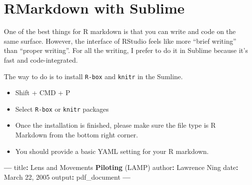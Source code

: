 \documentclass[]{book}
\newenvironment{Shaded}{\begin{snugshade}}{\end{snugshade}}
\newcommand{\DecValTok}[1]{\textcolor[rgb]{0.00,0.00,0.81}{#1}}
\newcommand{\KeywordTok}[1]{\textcolor[rgb]{0.13,0.29,0.53}{\textbf{#1}}}
\newcommand{\NormalTok}[1]{#1}
\newcommand{\OperatorTok}[1]{\textcolor[rgb]{0.81,0.36,0.00}{\textbf{#1}}}
\newcommand{\StringTok}[1]{\textcolor[rgb]{0.31,0.60,0.02}{#1}}
\providecommand{\tightlist}{%
  \setlength{\itemsep}{0pt}\setlength{\parskip}{0pt}}
\begin{document}
\hypertarget{rmarkdown-with-sublime}{%
\chapter{RMarkdown with Sublime}\label{rmarkdown-with-sublime}}

One of the best things for R markdown is that you can write and code on the same surface. However, the interface of RStudio feels like more ``brief writing'' than ``proper writing''. For all the writing, I prefer to do it in Sublime because it's fast and code-integrated.

The way to do is to install \texttt{R-box} and \texttt{knitr} in the Sumline.

\begin{itemize}
\tightlist
\item
  Shift + CMD + P
\item
  Select \texttt{R-box} or \texttt{knitr} packages
\item
  Once the installation is finished, please make sure the file type is R Markdown from the bottom right corner.
\item
  You should provide a basic YAML setting for your R markdown.
\end{itemize}

\begin{Shaded}
\begin{Highlighting}[]
\OperatorTok{---}
\NormalTok{title}\OperatorTok{:}\StringTok{ }\NormalTok{Lens and Movements }\KeywordTok{Piloting}\NormalTok{ (LAMP)}
\NormalTok{author}\OperatorTok{:}\StringTok{ }\NormalTok{Lawrence Ning}
\NormalTok{date}\OperatorTok{:}\StringTok{ }\NormalTok{March }\DecValTok{22}\NormalTok{, }\DecValTok{2005}
\NormalTok{output}\OperatorTok{:}\StringTok{ }\NormalTok{pdf_document}
\OperatorTok{---}\StringTok{ }
\end{Highlighting}
\end{Shaded}


\end{document}
